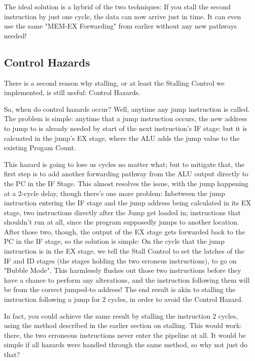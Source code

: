 \documentclass[12pt,twoside]{reedthesis}
\begin{document}
The ideal solution is a hybrid of the two techniques: If you stall the second instruction by just one cycle, the data can now arrive just in time. It can even use the same "MEM-EX Forwarding" from earlier without any new pathways needed!

\subsection{Control Hazards}

There is a second reason why stalling, or at least the Stalling Control we implemented, is still useful: Control Hazards.

So, when do control hazards occur? Well, anytime any jump instruction is called. The problem is simple: anytime that a jump instruction occurs, the new address to jump to is already needed by start of the next instruction's IF stage: but it is calcuated in the jump's EX stage, where the ALU adds the jump value to the existing Progam Count.

This hazard is going to lose us cycles no matter what; but to mitigate that, the first step is to add another forwarding pathway from the ALU output directly to the PC in the IF Stage. This almost resolves the issue, with the jump happening at a 2-cycle delay, though there's one more problem: Inbetween the  jump instruction entering the IF stage and the jump address being calculated in its EX stage, two instructions directly after the Jump get loaded in; instructions that shouldn't run at all, since the program supposedly jumps to another location. After those two, though, the output of the EX stage gets forwarded back to the PC in the IF stage, so the solution is simple: On the cycle that the jump instruction is in the EX stage, we tell the Stall Control to set the latches of the IF and ID stages (the stages holding the two erroneus instructions), to go on "Bubble Mode". This harmlessly flushes out those two instructions before they have a chance to perform any alterations, and the instruction following them will be from the correct jumped-to address! The end result is akin to stalling the instruction following a jump for 2 cycles, in order to avoid the Control Hazard.

In fact, you could achieve the same result by stalling the instruction 2 cycles, using the method described in the earlier section on stalling. This would work: there, the two erroneous instructions never enter the pipeline at all. It would be simple if all hazards were handled through the same method, so why not just do that?
\end{document}
